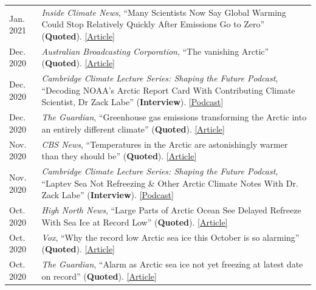 \documentclass[margin,line,palatino,courier,10pt]{res}
\begin{document}
\begin{resume}
\begin{tabular}{@{}p{0.9in}p{4in}}
Jan. 2021 & \textit{Inside Climate News}, ``Many Scientists Now Say Global Warming Could Stop Relatively Quickly After Emissions Go to Zero'' (\textbf{Quoted}). \href{https://insideclimatenews.org/news/03012021/five-aspects-climate-change-2020/}{[Article]}\\
Dec. 2020 & \textit{Australian Broadcasting Corporation}, ``The vanishing Arctic'' (\textbf{Quoted}). \href{https://www.abc.net.au/news/2020-12-16/arctic-sea-ice-dramatic-transformation-as-seen-by-satellites/12961584?nw=0}{[Article]}\\
Dec. 2020 & \textit{Cambridge Climate Lecture Series: Shaping the Future Podcast}, ``Decoding NOAA's Arctic Report Card With Contributing Climate Scientist, Dr Zack Labe'' (\textbf{Interview}). \href{https://climateseries.com/climate-change-podcast/80-arctic-report-card-zack-labe}{[Podcast]}\\
Dec. 2020 & \textit{The Guardian}, ``Greenhouse gas emissions transforming the Arctic into an entirely different climate'' (\textbf{Quoted}). \href{https://www.theguardian.com/world/2020/dec/08/arctic-report-climate-crisis-wildfires-ice-loss}{[Article]}\\
Nov. 2020 & \textit{CBS News}, ``Temperatures in the Arctic are astonishingly warmer than they should be'' (\textbf{Quoted}). \href{https://www.cbsnews.com/news/climate-change-arctic-temperatures-warmer/}{[Article]}\\
Nov. 2020 & \textit{Cambridge Climate Lecture Series: Shaping the Future Podcast}, ``Laptev Sea Not Refreezing \& Other Arctic Climate Notes With Dr. Zack Labe'' (\textbf{Interview}). \href{https://climateseries.com/climate-change-podcast/74-dr-zack-labe-arctic-laptev-sea}{[Podcast]}\\
Oct. 2020 & \textit{High North News}, ``Large Parts of Arctic Ocean See Delayed Refreeze With Sea Ice at Record Low'' (\textbf{Quoted}). \href{https://www.highnorthnews.com/en/large-parts-arctic-ocean-see-delayed-refreeze-sea-ice-record-low}{[Article]}\\
Oct. 2020 & \textit{Vox}, ``Why the record low Arctic sea ice this October is so alarming'' (\textbf{Quoted}). \href{https://www.vox.com/21536859/arctic-sea-ice-2020-climate-change-alaska-polar-bears-charts}{[Article]}\\
Oct. 2020 & \textit{The Guardian}, ``Alarm as Arctic sea ice not yet freezing at latest date on record'' (\textbf{Quoted}). \href{https://www.theguardian.com/world/2020/oct/22/alarm-as-arctic-sea-ice-not-yet-freezing-at-latest-date-on-record}{[Article]}\\

\end{tabular}
\end{resume}
\end{document}
